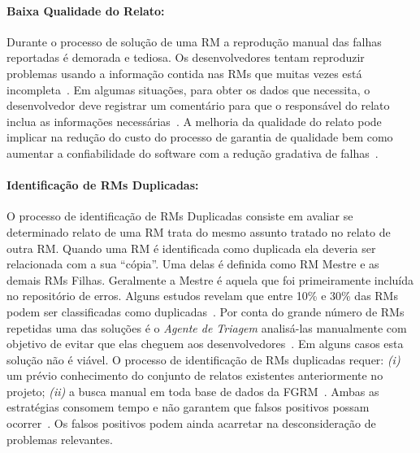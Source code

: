 \paragraph{Baixa Qualidade do Relato:}

Durante o processo de solução de uma RM a reprodução manual das falhas
reportadas é demorada e tediosa. Os desenvolvedores tentam reproduzir problemas
usando a informação contida nas RMs que muitas vezes está
incompleta~\cite{White:2015:GRR:2820282.2820291}. Em algumas situações, para
obter os dados que necessita, o desenvolvedor deve registrar um comentário para
que o responsável do relato inclua as informações necessárias~\cite{5070993}. A
melhoria da qualidade do relato pode implicar na redução do custo do processo de
garantia de qualidade bem como aumentar a confiabilidade do software com a
redução gradativa de falhas~\cite{Tu:2014:MQI:2677832.2677844}.



\paragraph{Identificação de RMs Duplicadas:}

O processo de identificação de RMs Duplicadas consiste em avaliar se determinado
relato de uma RM trata do mesmo assunto tratado no relato de outra RM\@. Quando
uma RM é identificada como duplicada ela deveria ser relacionada com a sua
``cópia''. Uma delas é definida como RM Mestre e as demais RMs Filhas.
Geralmente a Mestre é aquela que foi primeiramente incluída no repositório de
erros. Alguns estudos revelam que entre 10\% e 30\% das RMs podem ser
classificadas como
duplicadas~\cite{anvik2005coping,cavalcanti2013bug,Runeson:2007:DDD:1248820.1248882}.
Por conta do grande número de RMs repetidas uma das soluções é o \textit{Agente
    de Triagem} analisá-las manualmente com objetivo de evitar que elas cheguem
aos desenvolvedores~\cite{anvik2005coping}. Em alguns casos esta solução não é
viável. O processo de identificação de RMs duplicadas requer: \textit{(i)} um
prévio conhecimento do conjunto de relatos existentes anteriormente no projeto;
\textit{(ii)} a busca manual em toda base de dados da
FGRM~\cite{banerjee2012automated,
    Lerch:2013:FDY:2495256.2495763,hindle2016contextual}. Ambas as estratégias
consomem tempo e não garantem que falsos positivos possam
ocorrer~\cite{kaushik2012comparative}. Os falsos positivos podem ainda acarretar
na desconsideração de problemas relevantes.

